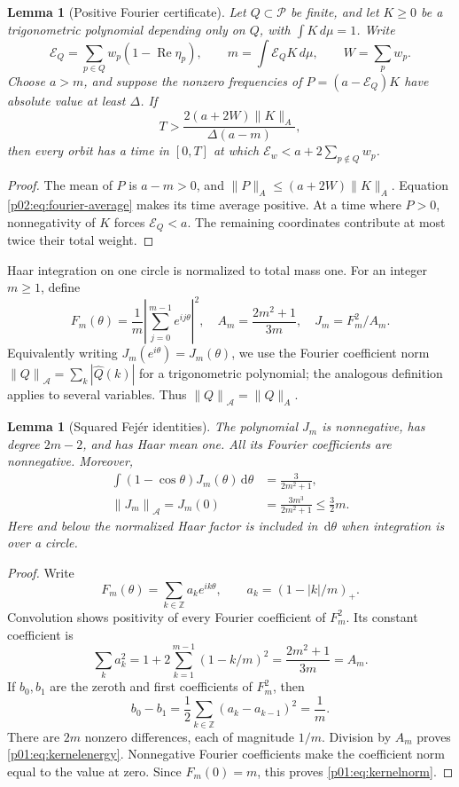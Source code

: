 \documentclass[11pt,letterpaper]{article}
\newtheorem{lemma}[theorem]{Lemma}
\theoremstyle{definition}
\theoremstyle{remark}
\newcommand{\Z}{\mathbb Z}
\newcommand{\dd}{\,\mathrm d}
\newcommand{\norm}[1]{\left\lVert#1\right\rVert}
\renewcommand{\Re}{\operatorname{Re}}
\newcommand{\1}{\mathbf 1}
\begin{document}
\begin{lemma}[Positive Fourier certificate]\label{p02:lem:certificate}
Let $Q\subset\mathcal P$ be finite, and let $K\ge0$ be a trigonometric
polynomial depending only on $Q$,
with $\int K\,d\mu=1$. Write
\[
 \mathcal E_Q=\sum_{p\in Q}w_p(1-\Re\eta_p),\qquad
 m=\int\mathcal E_Q K\,d\mu,\qquad W=\sum_p w_p.
\]
Choose $a>m$, and suppose the nonzero frequencies of
$P=(a-\mathcal E_Q)K$ have absolute value at least $\Delta$.
If
\begin{equation}\label{p02:eq:certificate-time}
 T>\frac{2(a+2W)\|K\|_A}{\Delta(a-m)},
\end{equation}
then every orbit has a time in $[0,T]$ at which
$\mathcal E_w<a+2\sum_{p\notin Q}w_p$.
\end{lemma}
\begin{proof}
The mean of $P$ is $a-m>0$, and
$\|P\|_A\le(a+2W)\|K\|_A$. Equation
\eqref{p02:eq:fourier-average} makes its time average positive. At a time
where $P>0$, nonnegativity of $K$ forces $\mathcal E_Q<a$.
The remaining coordinates contribute at most twice their total weight.
\end{proof}

Haar integration on one circle is normalized to total mass one. For an
integer $m\ge1$, define
\begin{equation}\label{p01:eq:kernel}
 F_m(\theta)=\frac1m\left|\sum_{j=0}^{m-1}e^{ij\theta}\right|^2,
 \quad A_m=\frac{2m^2+1}{3m},\quad J_m=F_m^2/A_m.
\end{equation}
Equivalently writing $J_m(e^{i\theta})=J_m(\theta)$, we use the Fourier coefficient norm
$\norm{Q}_{\mathcal A}=\sum_k|\widehat Q(k)|$ for a trigonometric
polynomial; the analogous definition applies to several variables. Thus $\norm{Q}_{\mathcal A}=\|Q\|_A$.

\begin{lemma}[Squared Fej\'er identities]\label{p01:lem:jackson}
The polynomial $J_m$ is nonnegative, has degree $2m-2$, and has Haar
mean one. All its Fourier coefficients are nonnegative. Moreover,
\begin{align}
 \int(1-\cos\theta)J_m(\theta)\dd\theta
 &=\frac3{2m^2+1},\label{p01:eq:kernelenergy}\\
 \norm{J_m}_{\mathcal A}=J_m(0)
 &=\frac{3m^3}{2m^2+1}\le\frac32m.
 \label{p01:eq:kernelnorm}
\end{align}
Here and below the normalized Haar factor is included in
$\dd\theta$ when integration is over a circle.
\end{lemma}
\begin{proof}
Write
\[
 F_m(\theta)=\sum_{k\in\Z}a_ke^{ik\theta},\qquad
 a_k=(1-|k|/m)_+.
\]
Convolution shows positivity of every Fourier coefficient of $F_m^2$.
Its constant coefficient is
\[
 \sum_k a_k^2=1+2\sum_{k=1}^{m-1}(1-k/m)^2
 =\frac{2m^2+1}{3m}=A_m.
\]
If $b_0,b_1$ are the zeroth and first coefficients of $F_m^2$, then
\[
 b_0-b_1=\frac12\sum_{k\in\Z}(a_k-a_{k-1})^2=\frac1m.
\]
There are $2m$ nonzero differences, each of magnitude $1/m$.
Division by $A_m$ proves \eqref{p01:eq:kernelenergy}. Nonnegative Fourier
coefficients make the coefficient norm equal to the value at zero.
Since $F_m(0)=m$, this proves \eqref{p01:eq:kernelnorm}.
\end{proof}
\end{document}
